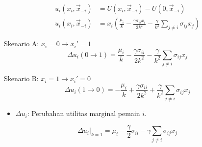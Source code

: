 \begin{align}
    u_i(x_i, \vec{x}_{-i}) &= U(x_i, \vec{x}_{-i}) - U(0, \vec{x}_{-i}) \\
    u_i(x_i, \vec{x}_{-i}) &= x_i \left( \frac{\mu_i}{k} - \frac{\gamma \sigma_{ii} x_i}{2k^2} - \frac{\gamma}{k^2} \sum_{j \ne i} \sigma_{ij} x_j \right)
\end{align}

Skenario A: $x_i = 0 \to x_i' = 1$
\begin{equation}
    \Delta u_i(0 \to 1) = \frac{\mu_i}{k} - \frac{\gamma \sigma_{ii}}{2k^2} - \frac{\gamma}{k^2} \sum_{j \ne i} \sigma_{ij} x_j
\end{equation}

Skenario B: $x_i = 1 \to x_i' = 0$
\begin{equation}
    \Delta u_i(1 \to 0) = -\frac{\mu_i}{k} + \frac{\gamma \sigma_{ii}}{2k^2} + \frac{\gamma}{k^2} \sum_{j \ne i} \sigma_{ij} x_j
\end{equation}
\begin{itemize}
    \item $\Delta u_i$: Perubahan utilitas marginal pemain $i$.
\end{itemize}

\begin{equation}
    \Delta u_i |_{k=1} = \mu_i - \frac{\gamma}{2} \sigma_{ii} - \gamma \sum_{j \ne i} \sigma_{ij} x_j
\end{equation}
